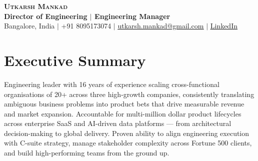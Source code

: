 \documentclass[letterpaper, 10pt]{article}
\begin{document}
\begin{center}
  \textbf{\Huge \scshape Utkarsh Mankad} \\
  \vspace{3pt}
  \textbf{Director of Engineering $|$ Engineering Manager}\\
  \vspace{3pt}
  \small Bangalore, India $|$ +91 8095173074 $|$
  \href{mailto:utkarsh.mankad@gmail.com}{\underline{utkarsh.mankad@gmail.com}}
  $|$ \href{https://linkedin.com/in/utkarsh-mankad}{\underline{LinkedIn}}
\end{center}

\vspace{-6pt}
\section{Executive Summary}
\small{Engineering leader with 16 years of experience scaling cross-functional organisations of 20+ across three high-growth companies, consistently translating ambiguous business problems into product bets that drive measurable revenue and market expansion. Accountable for multi-million dollar product lifecycles across enterprise SaaS and AI-driven data platforms --- from architectural decision-making to global delivery. Proven ability to align engineering execution with C-suite strategy, manage stakeholder complexity across Fortune 500 clients, and build high-performing teams from the ground up.}

\vspace{0pt}
\end{document}
